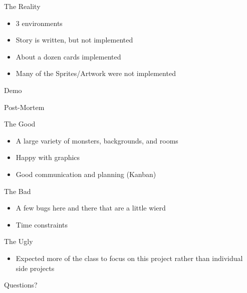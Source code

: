 \documentclass{../teamepsilon}
\begin{document}
\begin{frame}{The Reality}
    \begin{itemize}
         \item 3 environments
         \item Story is written, but not implemented
         \item About a dozen cards implemented
         \item Many of the Sprites/Artwork were not implemented
    \end{itemize}
\end{frame}

\begin{frame}[standout]
    \Huge
    Demo
\end{frame}

\begin{frame}[standout]
    \Huge
    Post-Mortem
\end{frame}

\begin{frame}{The Good}
    \begin{itemize}
        \item A large variety of monsters, backgrounds, and rooms
        \item Happy with graphics
        \item Good communication and planning (Kanban)
    \end{itemize}
\end{frame}

\begin{frame}{The Bad}
    \begin{itemize}
        \item A few bugs here and there that are a little wierd
        \item Time constraints
    \end{itemize}
\end{frame}

\begin{frame}{The Ugly}
    \begin{itemize}
        \item Expected more of the class to focus on this project rather than
              individual side projects
    \end{itemize}
\end{frame}

\begin{frame}[standout]
    \Huge
    Questions?
\end{frame}
\end{document}
